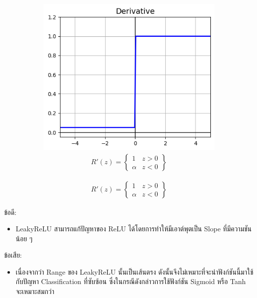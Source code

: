 \begin{itemize}
\begin{figure}[H]
\begin{subfigure}{0.5\textwidth}
            \includegraphics[width=0.9\linewidth]{fig/actfunc_leakyrelu_der.png}
            \caption{%
                \begin{equation}
                    \begin{split}R'(z) = \begin{Bmatrix} 1 & z>0 \\
                        \alpha & z<0 \end{Bmatrix}\end{split}
                \end{equation}
            }
            \label{fig:actfunc_leakyrelu_der}
        \end{subfigure}
    \end{figure}

    ข้อดี:
    \begin{itemize}
        \item LeakyReLU สามารถแก้ปัญหาของ ReLU ได้โดยการทำให้มีเอาต์พุตเป็น Slope ที่มีความชันน้อย ๆ
    \end{itemize}
    ข้อเสีย:
    \begin{itemize}
        \item เนื่องจากว่า Range ของ LeakyReLU นั้นเป็นเส้นตรง ดังนั้นจึงไม่เหมาะที่จะนำฟังก์ชันนี้มาใช้กับปัญหา Classification 
        ที่ซับซ้อน ซึ่งในกรณีดังกล่าวการใช้ฟังก์ชัน Sigmoid หรือ Tanh จะเหมาะสมกว่า
    \end{itemize}


\end{itemize}
